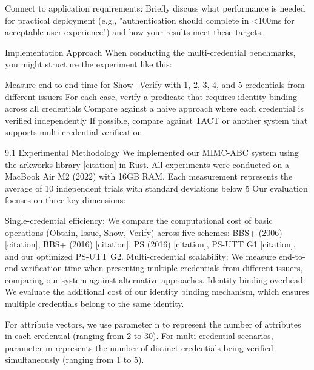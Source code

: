 Connect to application requirements: Briefly discuss what performance is needed for practical deployment (e.g., "authentication should complete in <100ms for acceptable user experience") and how your results meet these targets.

Implementation Approach
When conducting the multi-credential benchmarks, you might structure the experiment like this:

Measure end-to-end time for Show+Verify with 1, 2, 3, 4, and 5 credentials from different issuers
For each case, verify a predicate that requires identity binding across all credentials
Compare against a naive approach where each credential is verified independently
If possible, compare against TACT or another system that supports multi-credential verification





9.1 Experimental Methodology
We implemented our MIMC-ABC system using the arkworks library [citation] in Rust. All experiments were conducted on a MacBook Air M2 (2022) with 16GB RAM. Each measurement represents the average of 10 independent trials with standard deviations below 5%
Our evaluation focuses on three key dimensions:

Single-credential efficiency: We compare the computational cost of basic operations (Obtain, Issue, Show, Verify) across five schemes: BBS+ (2006) [citation], BBS+ (2016) [citation], PS (2016) [citation], PS-UTT G1 [citation], and our optimized PS-UTT G2.
Multi-credential scalability: We measure end-to-end verification time when presenting multiple credentials from different issuers, comparing our system against alternative approaches.
Identity binding overhead: We evaluate the additional cost of our identity binding mechanism, which ensures multiple credentials belong to the same identity.

For attribute vectors, we use parameter n to represent the number of attributes in each credential (ranging from 2 to 30). For multi-credential scenarios, parameter m represents the number of distinct credentials being verified simultaneously (ranging from 1 to 5).


